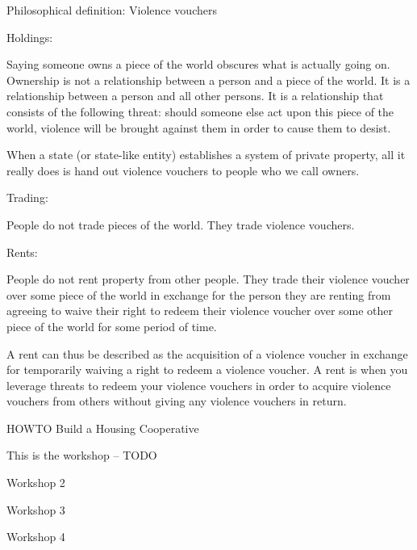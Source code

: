 \documentclass{article}
\begin{document}
\large Philosophical definition: Violence vouchers

\large Holdings:

Saying someone owns a piece of the world obscures what is actually going on. Ownership is not a relationship between a person and a piece of the world. It is a relationship between a person and all other persons. It is a relationship that consists of the following threat: should someone else act upon this piece of the world, violence will be brought against them in order to cause them to desist.

When a state (or state-like entity) establishes a system of private property, all it really does is hand out violence vouchers to people who we call owners. 

\large Trading:

People do not trade pieces of the world. They trade violence vouchers. 

\large Rents:

People do not rent property from other people. They trade their violence voucher over some piece of the world in exchange for the person they are renting from agreeing to waive their right to redeem their violence voucher over some other piece of the world for some period of time.

A rent can thus be described as the acquisition of a violence voucher in exchange for temporarily waiving a right to redeem a violence voucher. A rent is when you leverage threats to redeem your violence vouchers in order to acquire violence vouchers from others without giving any violence vouchers in return.


\pagebreak

\huge HOWTO Build a Housing Cooperative

This is the workshop -- TODO

\pagebreak

Workshop 2


\pagebreak

Workshop 3

\vspace{1cm}

\pagebreak

Workshop 4

\vspace{1cm}

\pagebreak
\end{document}
